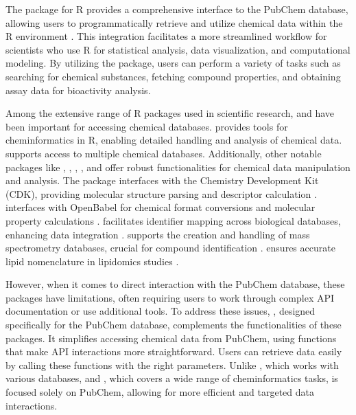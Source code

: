 The  package for R provides a comprehensive interface to the PubChem database, allowing users to programmatically retrieve and utilize chemical data within the R environment \citep{Korkmaz2024}. This integration facilitates a more streamlined workflow for scientists who use R for statistical analysis, data visualization, and computational modeling. By utilizing the  package, users can perform a variety of tasks such as searching for chemical substances, fetching compound properties, and obtaining assay data for bioactivity analysis.

Among the extensive range of R packages used in scientific research,  \citep{szocs2020webchem} and  \citep{cao2008chemminer} have been important for accessing chemical databases.  provides tools for cheminformatics in R, enabling detailed handling and analysis of chemical data.  supports access to multiple chemical databases. Additionally, other notable packages like , , , , and  offer robust functionalities for chemical data manipulation and analysis. The  package interfaces with the Chemistry Development Kit (CDK), providing molecular structure parsing and descriptor calculation \citep{guha2007chemical}.  interfaces with OpenBabel for chemical format conversions and molecular property calculations \citep{horan2024}.  facilitates identifier mapping across biological databases, enhancing data integration \citep{leemans2018}.  supports the creation and handling of mass spectrometry databases, crucial for compound identification \citep{stravs2013automatic}.  ensures accurate lipid nomenclature in lipidomics studies \citep{kopczynski2020goslin}.

However, when it comes to direct interaction with the PubChem database, these packages have limitations, often requiring users to work through complex API documentation or use additional tools. To address these issues, , designed specifically for the PubChem database, complements the functionalities of these packages. It simplifies accessing chemical data from PubChem, using functions that make API interactions more straightforward. Users can retrieve data easily by calling these functions with the right parameters. Unlike , which works with various databases, and , which covers a wide range of cheminformatics tasks,  is focused solely on PubChem, allowing for more efficient and targeted data interactions.

